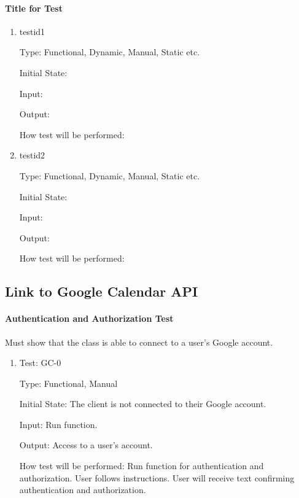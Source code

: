 \documentclass[12pt, titlepage]{article}
\begin{document}
\paragraph{Title for Test}

\begin{enumerate}

\item{testid1\\}

Type: Functional, Dynamic, Manual, Static etc.
					
Initial State: 
					
Input: 
					
Output: 
					
How test will be performed: 
					
\item{testid2\\}

Type: Functional, Dynamic, Manual, Static etc.
					
Initial State: 
					
Input: 
					
Output: 
					
How test will be performed: 

\end{enumerate}

\subsection{Link to Google Calendar API}

\paragraph{Authentication and Authorization Test}
Must show that the class is able to connect to a user's Google account.
\begin{enumerate}

\item{Test: GC-0\\}

Type: Functional, Manual
					
Initial State: The client is not connected to their Google account. 
					
Input: Run function.
					
Output: Access to a user's account.
					
How test will be performed: Run function for authentication and authorization. 
User follows instructions. 
User will receive text confirming authentication and authorization.
\end{enumerate}
\end{document}
